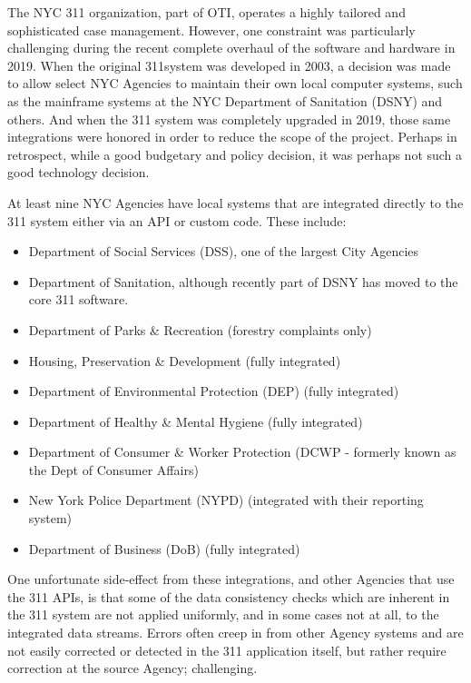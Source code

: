 \documentclass[12pt, titlepage]{article}
\begin{document}
The NYC 311 organization, part of OTI, operates a highly tailored and sophisticated case
management. However, one constraint was particularly challenging 
during the recent complete overhaul of the software and hardware in 2019. When the original 311system was developed in 2003, a decision was made to allow select 
NYC Agencies to maintain their own local computer systems, 
such as the mainframe systems at the NYC Department of Sanitation (DSNY) and others. 
And when the 311 system was completely upgraded in 2019, those
same integrations were honored in order to reduce the scope of the project. 
Perhaps in retrospect, while a good budgetary and policy decision, 
it was perhaps not such a good technology decision.

At least nine NYC Agencies have local systems that are integrated 
directly to the 311 system either via an API or custom code. These include:

\begin{itemize}
	\item Department of Social Services (DSS), one of the largest City Agencies
	\item Department of Sanitation, although recently part of DSNY 
	has moved to the core 311 software.
	\item Department of Parks \& Recreation (forestry complaints only)
	\item Housing, Preservation \& Development (fully integrated)
	\item Department of Environmental Protection (DEP) (fully integrated)
	\item Department of Healthy \& Mental Hygiene (fully integrated) 
	\item Department of Consumer \& Worker Protection 
	(DCWP - formerly known as the Dept of Consumer Affairs)
	\item New York Police Department (NYPD) (integrated with their reporting system)
	\item Department of Business (DoB) (fully integrated)
\end{itemize}

One unfortunate side-effect from these integrations, and other Agencies 
that use the 311 APIs, is that some of the data consistency
checks which are inherent in the 311 system are not applied uniformly, 
and in some cases not at all, to the integrated data streams.
Errors often creep in from other Agency systems and are not easily 
corrected or detected in the 311 application itself,
but rather require correction at the source Agency; challenging.
\end{document}
